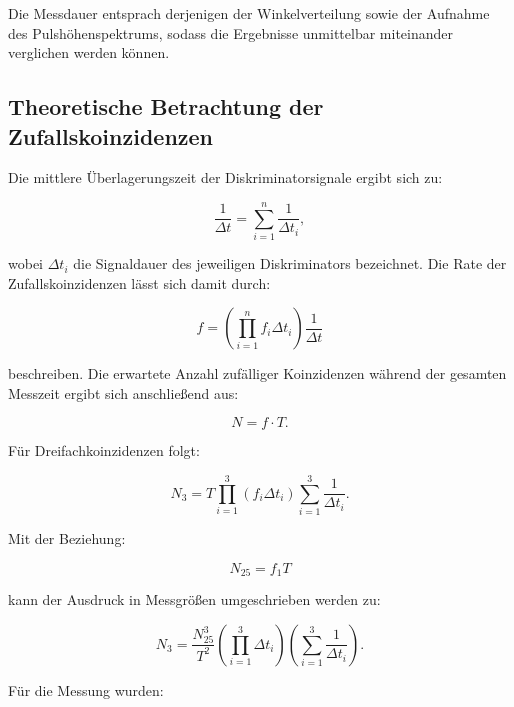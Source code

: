 Die Messdauer entsprach derjenigen der Winkelverteilung sowie der Aufnahme des Pulshöhenspektrums, sodass die Ergebnisse unmittelbar miteinander verglichen werden können.

\subsection{Theoretische Betrachtung der Zufallskoinzidenzen}

Die mittlere Überlagerungszeit der Diskriminatorsignale ergibt sich zu:

\begin{equation}
    \frac{1}{\Delta t}
    =
    \sum_{i=1}^{n}
    \frac{1}{\Delta t_i},
\end{equation}

wobei $\Delta t_i$ die Signaldauer des jeweiligen Diskriminators bezeichnet. Die Rate der
Zufallskoinzidenzen lässt sich damit durch:

\begin{equation}
    f
    =
    \left(
    \prod_{i=1}^{n}
    f_i\Delta t_i
    \right)
    \frac{1}{\Delta t}
\end{equation}

beschreiben. Die erwartete Anzahl zufälliger Koinzidenzen während der gesamten Messzeit
ergibt sich anschließend aus:

\begin{equation}
    N=f\cdot T.
\end{equation}

Für Dreifachkoinzidenzen folgt:

\begin{equation}
    N_3
    =
    T
    \prod_{i=1}^{3}
    (f_i\Delta t_i)
    \sum_{i=1}^{3}
    \frac{1}{\Delta t_i}.
\end{equation}

Mit der Beziehung:

\begin{equation}
    N_{25}=f_1T
\end{equation}

kann der Ausdruck in Messgrößen umgeschrieben werden zu:

\begin{equation}
    N_3
    =
    \frac{N_{25}^{3}}{T^{2}}
    \left(
    \prod_{i=1}^{3}
    \Delta t_i
    \right)
    \left(
    \sum_{i=1}^{3}
    \frac{1}{\Delta t_i}
    \right).
\end{equation}

Für die Messung wurden:

